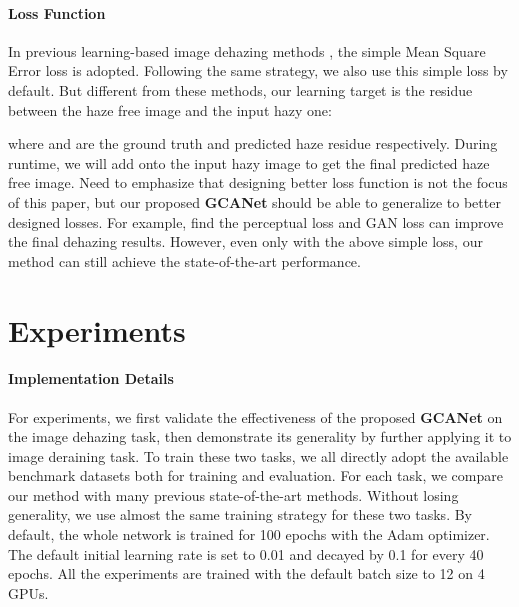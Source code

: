 \documentclass[10pt,twocolumn,letterpaper]{article}
\begin{document}
\paragraph{Loss Function}
In previous learning-based image dehazing methods \cite{cai2016dehazenet,ren2016single,li2017aod,li2018single,zhang2018densely,zhang2018multi}, the simple Mean Square Error loss is  adopted. Following the same strategy, we also use this simple loss by default. But different from these methods, our learning target is the residue between the  haze free image and the input hazy one:

where  and  are the ground truth and predicted haze residue respectively. During runtime, we will add  onto the input hazy image to get the final predicted haze free image. Need to emphasize that designing better loss function is not the focus of this paper, but our proposed \textbf{GCANet} should be able to generalize to better designed losses. For example, \cite{li2018single,zhang2018densely,zhang2018multi} find the perceptual loss \cite{johnson2016perceptual} and GAN loss can improve the final dehazing results. However, even only with the above simple loss, our method can still achieve the state-of-the-art performance.

\section{Experiments}
\paragraph{Implementation Details} For experiments, we first validate the effectiveness of the proposed \textbf{GCANet} on the image dehazing task, then demonstrate its generality by further applying it to image deraining task. To train these two tasks, we all directly adopt the available benchmark datasets both for training and evaluation. For each task, we compare our method with many previous state-of-the-art methods.  Without losing generality, we use almost the same training strategy for these two tasks. By default, the whole network is trained for 100 epochs with the Adam optimizer. The default initial learning rate is set to 0.01 and decayed by 0.1 for every 40 epochs. All the experiments are trained with the default batch size to 12 on 4 GPUs.
\end{document}

